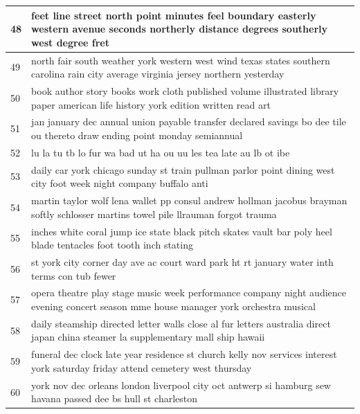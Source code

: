 \documentclass[letterpaper,11pt]{report}
\begin{document}
\begin{longtable}[c]{| p{1cm} | p{16cm} |}
48 & feet line street north point minutes feel boundary easterly western avenue seconds northerly distance degrees southerly west degree fret                         \\ \hline
49 & north fair south weather york western west wind texas states southern carolina rain city average virginia jersey northern yesterday                              \\ \hline
50 & book author story books work cloth published volume illustrated library paper american life history york edition written read art                                \\ \hline
51 & jan january dec annual union payable transfer declared savings bo dee tile ou thereto draw ending point monday semiannual                                        \\ \hline
52 & lu la tu tb lo fur wa bad ut ha ou uu les tea late au lb ot ibe                                                                                                  \\ \hline
53 & daily car york chicago sunday st train pullman parlor point dining west city foot week night company buffalo anti                                                \\ \hline
54 & martin taylor wolf lena wallet pp consul andrew hollman jacobus brayman softly schlosser martins towel pile llrauman forgot trauma                               \\ \hline
55 & inches white coral jump ice state black pitch skates vault bar poly heel blade tentacles foot tooth inch stating                                                 \\ \hline
56 & st york city corner day ave ac court ward park ht rt january water inth terms con tub fewer                                                                      \\ \hline
57 & opera theatre play stage music week performance company night audience evening concert season mme house manager york orchestra musical                           \\ \hline
58 & daily steamship directed letter walls close al fur letters australia direct japan china steamer la supplementary mall ship hawaii                                \\ \hline
59 & funeral dec clock late year residence st church kelly nov services interest york saturday friday attend cemetery west thursday                                   \\ \hline
60 & york nov dec orleans london liverpool city oct antwerp si hamburg sew havana passed dee bs hull st charleston                                                    \\ \hline

\end{longtable}
\end{document}
